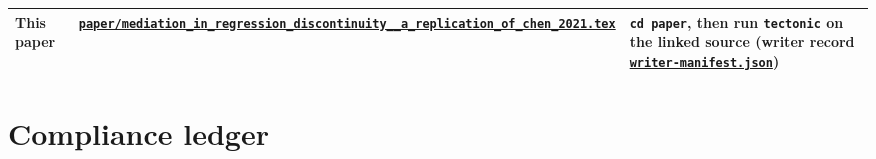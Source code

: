 {\begin{longtable}{@{}>{\raggedright\arraybackslash}p{}>{\raggedright\arraybackslash}p{}>{\raggedright\arraybackslash}p{}@{}}
This paper & \href{https://github.com/alectionary/vibe-math/blob/master/formalization/chen-rdd-mediation/paper/mediation_in_regression_discontinuity__a_replication_of_chen_2021.tex}{\nolinkurl{paper/mediation_in_regression_discontinuity__a_replication_of_chen_2021.tex}} & \texttt{cd paper}, then run \texttt{tectonic} on the linked source (writer record \href{https://github.com/alectionary/vibe-math/blob/master/formalization/chen-rdd-mediation/writer-manifest.json}{\nolinkurl{writer-manifest.json}})\\
\bottomrule
\end{longtable}}

\section{Compliance ledger}\label{app:ledger}

